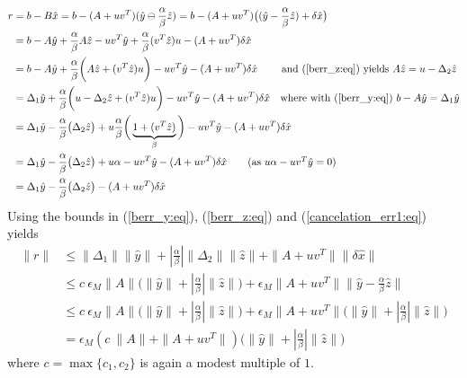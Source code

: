 \documentclass{siamltex}
\newcommand{\eqnref}[1]{(\ref{#1})}
\newcommand{\eps}{\epsilon}
\begin{document}
\begin{align*}
r &= b - B \hat x = b - (A+uv^T) (\hat y \ominus \frac{\alpha}{\beta} \hat z)  =  b - (A+uv^T) \big( (\hat y - \frac{\alpha}{\beta}\hat z) + \delta \hat x \big)\\
&= b - A \hat y + \frac{\alpha}{\beta} A \hat z - u v^T \hat y + \frac{\alpha}{\beta} (v^T \hat z) u - (A+uv^T) \delta \hat x \\
&= b - A \hat y + \frac{\alpha}{\beta} \bigg( A \hat z + (v^T \hat z) u \bigg) - u v^T \hat y - (A+uv^T) \delta \hat x  \quad \ \ \ \ \mbox{and \eqnref{berr_z:eq} yields }  A \hat z = u - \Delta_2 \hat z  \\
&= \Delta_1 \hat y + \frac{\alpha}{\beta} \bigg( u -  \Delta_2 \hat z + (v^T \hat z) u \bigg) - u v^T \hat y - (A+uv^T) \delta \hat x \quad \mbox{where with \eqnref{berr_y:eq} }  b - A \hat y = \Delta_1 \hat y \\
&= \Delta_1 \hat y - \frac{\alpha}{\beta} \big(\Delta_2 \hat z \big) + 
u \frac{\alpha}{\beta} \bigg( \underbrace{1 + (v^T \hat z)}_{\beta} \bigg) - u v^T \hat y - (A+uv^T) \delta \hat x  \\
&= \Delta_1 \hat y - \frac{\alpha}{\beta} \big(\Delta_2 \hat z \big) + 
u \alpha  - u v^T \hat y - (A+uv^T) \delta \hat x \quad \quad \mbox{(as $u \alpha  - u v^T \hat y = 0$)}\\
&= \Delta_1 \hat y - \frac{\alpha}{\beta} \big(\Delta_2 \hat z \big) - (A+uv^T) \delta \hat x
\end{align*}
Using the bounds in \eqnref{berr_y:eq}, \eqnref{berr_z:eq} and \eqnref{cancelation_err1:eq} yields
\begin{align}
\| r \| &\leq \|\Delta_1 \| \|\hat y\| +  |\frac{\alpha}{\beta}| \| \Delta_2\| \|\hat z\| + \| A+uv^T\| \|\delta \hat x\| \nonumber\\
& \leq c \ \eps_M \| A\| \Big( \|\hat y\| +  |\frac{\alpha}{\beta}| \|\hat z\| \Big) + \eps_M \| A+uv^T\|  \|\hat y - \frac{\alpha}{\beta}\hat z\| \nonumber\\
& \leq c \ \eps_M \| A\| \Big( \|\hat y\| +  |\frac{\alpha}{\beta}| \|\hat z\| \Big) + \eps_M \| A+uv^T\|  \big( \|\hat y\| + |\frac{\alpha}{\beta}| \|\hat z\| \big) \nonumber \\
& = \eps_M (c\ \| A\| + \| A + uv^T\|) \Big( \|\hat y\| +  |\frac{\alpha}{\beta}| \|\hat z\| \Big) \label{res_bnd:eq}
\end{align}
where $c = \max \{c_1, c_2 \}$ is again a modest multiple of $1$. 
\end{document}
